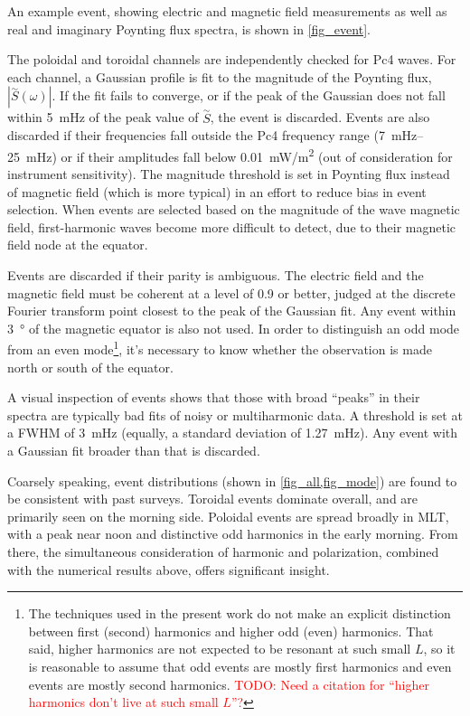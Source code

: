 \documentclass{article}
\newcommand{\dft}[1]{\ensuremath{\overset{\sim}{#1}}\xspace}
\newcommand{\todo}[1]{ \textcolor{red}{TODO: #1} }
\newcommand{\lr}[1]{ \left( #1 \right) }
\renewcommand{\arg}[1]{\!\lr{#1}}
\begin{document}
An example event, showing electric and magnetic field measurements as well as real and imaginary Poynting flux spectra, is shown in \cref{fig_event}.

The poloidal and toroidal channels are independently checked for Pc4 waves. For each channel, a Gaussian profile is fit to the magnitude of the Poynting flux, $|\dft{S}\arg{\omega}|$. If the fit fails to converge, or if the peak of the Gaussian does not fall within \SI{5}{\mHz} of the peak value of \dft{S}, the event is discarded. Events are also discarded if their frequencies fall outside the Pc4 frequency range (\SIrange{7}{25}{\mHz}) or if their amplitudes fall below \SI{0.01}{\mW/\m\squared} (out of consideration for instrument sensitivity). The magnitude threshold is set in Poynting flux instead of magnetic field (which is more typical) in an effort to reduce bias in event selection. When events are selected based on the magnitude of the wave magnetic field, first-harmonic waves become more difficult to detect, due to their magnetic field node at the equator\cite{dai_2015}.

Events are discarded if their parity is ambiguous. The electric field and the magnetic field must be coherent at a level of 0.9 or better, judged at the discrete Fourier transform point closest to the peak of the Gaussian fit. Any event within \SI{3}{\degree} of the magnetic equator is also not used. In order to distinguish an odd mode from an even mode\footnote{
The techniques used in the present work do not make an explicit distinction between first (second) harmonics and higher odd (even) harmonics. That said, higher harmonics are not expected to be resonant at such small $L$, so it is reasonable to assume that odd events are mostly first harmonics and even events are mostly second harmonics. \todo{Need a citation for ``higher harmonics don't live at such small $L$''?}
}, it's necessary to know whether the observation is made north or south of the equator.

A visual inspection of events shows that those with broad ``peaks'' in their spectra are typically bad fits of noisy or multiharmonic data. A threshold is set at a FWHM of \SI{3}{\mHz} (equally, a standard deviation of \SI{1.27}{\mHz}). Any event with a Gaussian fit broader than that is discarded.


Coarsely speaking, event distributions (shown in \cref{fig_all,fig_mode}) are found to be consistent with past surveys. Toroidal events dominate overall, and are primarily seen on the morning side. Poloidal events are spread broadly in MLT, with a peak near noon and distinctive odd harmonics in the early morning. From there, the simultaneous consideration of harmonic and polarization, combined with the numerical results above, offers significant insight.
\end{document}
